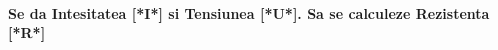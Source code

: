 \documentclass{exam}
\begin{document}
\paragraph{
Se da Intesitatea [*I*] si Tensiunea [*U*].
Sa se calculeze Rezistenta [*R*]
}
\end{document}
